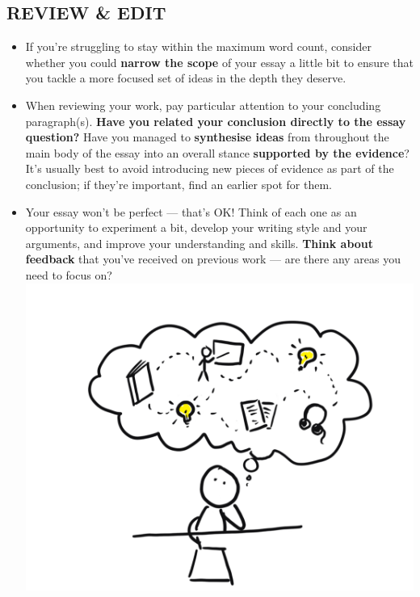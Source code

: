 \documentclass[10pt,a4paper]{article}
\begin{document}
\begin{multicols}{2}
\section*{REVIEW \& EDIT}

\begin{itemize}
  \item If you’re struggling to stay within the maximum word count, consider
whether you could \textbf{narrow the scope} of your essay a little bit to ensure
that you tackle a more focused set of ideas in the depth they deserve.
  \item When reviewing your work, pay particular attention to your concluding
paragraph(s). \textbf{Have you related your conclusion directly to the essay
question?} Have you managed to \textbf{synthesise ideas} from throughout the
main body of the essay into an overall stance \textbf{supported by the
evidence}? It’s usually best to avoid introducing new pieces of evidence as part
of the conclusion; if they’re important, find an earlier spot for them.
  \item Your essay won’t be perfect --- that’s OK! Think of each one as an
opportunity to experiment a bit, develop your writing style and your arguments,
and improve your understanding and skills. \textbf{Think about feedback} that
you’ve received on previous work --- are there any areas you need to focus on?
\includegraphics[width=0.9\columnwidth]{cartoons/synthesise.png}
\end{itemize}


\end{multicols}
\end{document}
